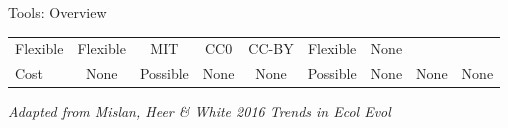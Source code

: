 \documentclass[ignorenonframetext,]{beamer}
\begin{document}
\begin{frame}{Tools: Overview}
\begin{longtable}[]{@{}lcccccccc@{}}
\begin{minipage}[t]{0.05\columnwidth}
Flexible\strut
\end{minipage} & \begin{minipage}[t]{0.05\columnwidth}\centering
Flexible\strut
\end{minipage} & \begin{minipage}[t]{0.07\columnwidth}\centering
MIT\strut
\end{minipage} & \begin{minipage}[t]{0.04\columnwidth}\centering
CC0\strut
\end{minipage} & \begin{minipage}[t]{0.06\columnwidth}\centering
CC-BY\strut
\end{minipage} & \begin{minipage}[t]{0.15\columnwidth}\centering
Flexible\strut
\end{minipage} & \begin{minipage}[t]{0.18\columnwidth}\centering
None\strut
\end{minipage}\tabularnewline
\begin{minipage}[t]{0.12\columnwidth}\raggedright
Cost\strut
\end{minipage} & \begin{minipage}[t]{0.05\columnwidth}\centering
None\strut
\end{minipage} & \begin{minipage}[t]{0.05\columnwidth}\centering
Possible\strut
\end{minipage} & \begin{minipage}[t]{0.05\columnwidth}\centering
None\strut
\end{minipage} & \begin{minipage}[t]{0.07\columnwidth}\centering
None\strut
\end{minipage} & \begin{minipage}[t]{0.04\columnwidth}\centering
Possible\strut
\end{minipage} & \begin{minipage}[t]{0.06\columnwidth}\centering
None\strut
\end{minipage} & \begin{minipage}[t]{0.15\columnwidth}\centering
None\strut
\end{minipage} & \begin{minipage}[t]{0.18\columnwidth}\centering
None\strut
\end{minipage}\tabularnewline
\bottomrule
\end{longtable}

\emph{Adapted from Mislan, Heer \& White 2016 Trends in Ecol Evol}

\end{frame}
\end{document}
